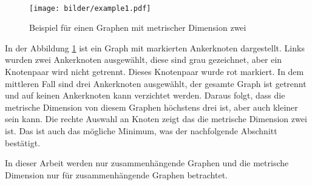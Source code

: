 \begin{bsp}~
\begin{figure}[h!]
		\centering 		 
   \texttt{[image: bilder/example1.pdf]}
	\caption{Beispiel für einen Graphen mit metrischer Dimension zwei}
  	 \label{bild:bsp}
  	 \end{figure}
In der Abbildung \ref{bild:bsp} ist ein Graph mit markierten Ankerknoten dargestellt.
Links wurden zwei Ankerknoten ausgewählt, diese sind grau gezeichnet, aber ein Knotenpaar wird nicht getrennt. Dieses Knotenpaar wurde rot markiert. In dem mittleren Fall sind drei Ankerknoten ausgewählt, der gesamte Graph ist getrennt und auf keinen Ankerknoten kann verzichtet werden. Daraus folgt, dass die metrische Dimension von diesem Graphen höchstens drei ist, aber auch kleiner sein kann. Die rechte Auswahl an Knoten zeigt das die metrische Dimension zwei ist. Das ist auch das mögliche Minimum, was der nachfolgende Abschnitt bestätigt.
\end{bsp}
\begin{bem}
In dieser Arbeit werden nur zusammenhängende Graphen und die metrische Dimension nur für zusammenhängende Graphen betrachtet.
\end{bem}
\newpage

